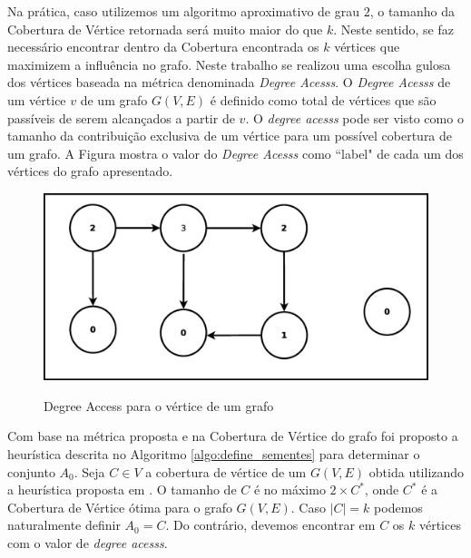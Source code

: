 \documentclass[12pt]{article}
\begin{document}
Na prática, caso utilizemos um algoritmo aproximativo de grau $2$, o tamanho da Cobertura de Vértice retornada será muito maior do que $k$. Neste sentido, se faz necessário encontrar dentro da Cobertura encontrada os $k$ vértices que maximizem a influência no grafo. Neste trabalho se realizou uma escolha gulosa dos vértices baseada na métrica denominada \textit{Degree Acesss}. O \textit{Degree Acesss} de um vértice $v$ de um grafo $G(V,E)$ é definido como total de vértices que são passíveis de serem alcançados a partir de $v$. O \textit{degree acesss} pode ser visto como o tamanho da contribuição exclusiva de um vértice para um possível cobertura de um grafo. A Figura mostra o valor do \textit{Degree Acesss} como ``label" de cada um dos vértices do grafo apresentado.

\begin{figure}[!t]
\centering
\includegraphics[width=4.5in]{../img/graph_deegree_acess.eps}
\label{fig_vertex_cover}
\caption{Degree Access para o vértice de um grafo}
\end{figure}


Com base na métrica proposta e na Cobertura de Vértice do grafo foi proposto a heurística descrita no Algoritmo \ref{algo:define_sementes} para determinar o conjunto $A_{0}$. Seja $C \in V$ a cobertura de vértice de um $G(V,E)$ obtida utilizando a heurística proposta em \cite{Cormen:2009:IAT:1614191}. O tamanho de $C$ é no máximo $ 2 \times C^{*}$, onde $C^{*}$ é a Cobertura de Vértice ótima para o grafo $G(V,E)$. Caso $|C| = k$ podemos naturalmente definir $A_{0} = C$. Do contrário, devemos encontrar em $C$ os $k$ vértices com o valor de \textit{degree acesss}{}.
\end{document}
